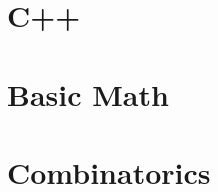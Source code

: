 \documentclass[10pt, twocolumn]{article}
\begin{document}
\section{C++}


\section{Basic Math}



\section{Combinatorics}


\end{document}
